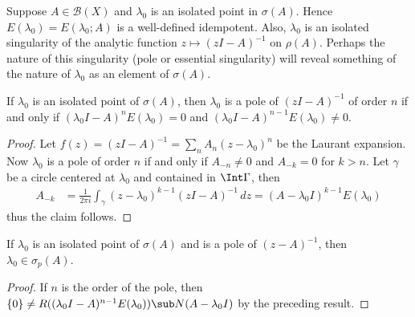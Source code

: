 Suppose $A\in\mathcal{B}(X)$ and $\lambda_0$ is an isolated point in $\sigma(A)$. Hence $E(\lambda_0)=E(\lambda_0;A)$ is a well-defined idempotent. Also, $\lambda_0$ is an isolated singularity of the analytic function $z\mapsto(zI-A)^{-1}$ on $\rho(A)$. Perhaps the nature of this singularity (pole or essential singularity) will reveal something of the nature of $\lambda_0$ as an element of $\sigma(A)$.
\begin{proposition}\label{spectrum isolated point pole iff}
If $\lambda_0$ is an isolated point of $\sigma(A)$, then $\lambda_0$ is a pole of $(zI-A)^{-1}$ of order $n$ if and only if $(\lambda_0I-A)^nE(\lambda_0)=0$ and $(\lambda_0I-A)^{n-1}E(\lambda_0)\neq 0$.
\end{proposition}
\begin{proof}
Let $f(z)=(zI-A)^{-1}=\sum_nA_n(z-\lambda_0)^n$ be the Laurant expansion. Now $\lambda_0$ is a pole of order $n$ if and only if $A_{-n}\neq 0$ and $A_{-k}=0$ for $k>n$. Let $\gamma$ be a circle centered at $\lambda_0$ and contained in $\Int\Gamma$, then
\begin{align*}
A_{-k}&=\frac{1}{2\pi i}\int_{\gamma}(z-\lambda_0)^{k-1}(zI-A)^{-1}\,dz=(A-\lambda_0I)^{k-1}E(\lambda_0)
\end{align*}
thus the claim follows.
\end{proof}
\begin{corollary}
If $\lambda_0$ is an isolated point of $\sigma(A)$ and is a pole of $(z-A)^{-1}$, then $\lambda_0\in\sigma_p(A)$.
\end{corollary}
\begin{proof}
If $n$ is the order of the pole, then $\{0\}\neq R((\lambda_0I-A)^{n-1}E(\lambda_0))\sub N(A-\lambda_0I)$ by the preceding result.
\end{proof}
